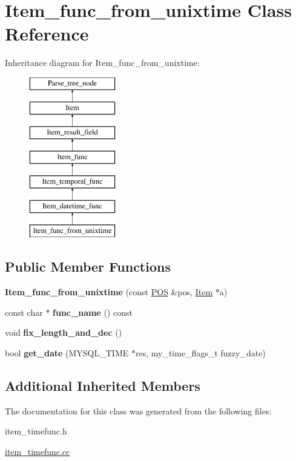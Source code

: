 \hypertarget{classItem__func__from__unixtime}{}\section{Item\+\_\+func\+\_\+from\+\_\+unixtime Class Reference}
\label{classItem__func__from__unixtime}
Inheritance diagram for Item\+\_\+func\+\_\+from\+\_\+unixtime\+:\begin{figure}[H]
\begin{center}
\leavevmode
\includegraphics[height=7.000000cm]{classItem__func__from__unixtime}
\end{center}
\end{figure}
\subsection*{Public Member Functions}
\begin{DoxyCompactItemize}
\item 
\mbox{\label{classItem__func__from__unixtime_ae11eb849c261804883f5ba30f41a1943}} 
{\bfseries Item\+\_\+func\+\_\+from\+\_\+unixtime} (const \mbox{\hyperlink{structYYLTYPE}{P\+OS}} \&pos, \mbox{\hyperlink{classItem}{Item}} $\ast$a)
\item 
\mbox{\label{classItem__func__from__unixtime_ad8c35164f23de3f1351e7cf52f8585d7}} 
const char $\ast$ {\bfseries func\+\_\+name} () const
\item 
\mbox{\label{classItem__func__from__unixtime_a0034cd6222dcc5dbc31b3e70a43a4c80}} 
void {\bfseries fix\+\_\+length\+\_\+and\+\_\+dec} ()
\item 
\mbox{\label{classItem__func__from__unixtime_ab5d49868f8008da058b1777d842aea70}} 
bool {\bfseries get\+\_\+date} (M\+Y\+S\+Q\+L\+\_\+\+T\+I\+ME $\ast$res, my\+\_\+time\+\_\+flags\+\_\+t fuzzy\+\_\+date)
\end{DoxyCompactItemize}
\subsection*{Additional Inherited Members}


The documentation for this class was generated from the following files\+:\begin{DoxyCompactItemize}
\item 
item\+\_\+timefunc.\+h\item 
\mbox{\hyperlink{item__timefunc_8cc}{item\+\_\+timefunc.\+cc}}\end{DoxyCompactItemize}
